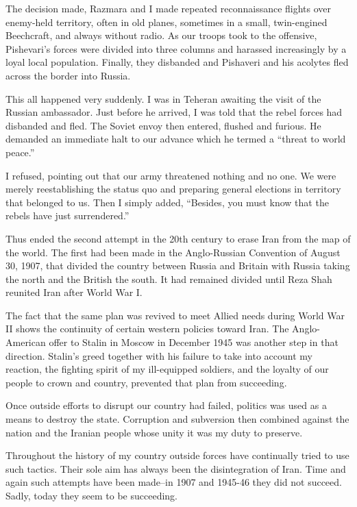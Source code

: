 The decision made, Razmara and I made repeated reconnaissance flights over enemy-held territory, often in old planes, sometimes in a small, twin-engined Beechcraft, and always without radio. As our troops took to the offensive, Pishevari's forces were divided into three columns and harassed increasingly by a loyal local population. Finally, they disbanded and Pishaveri and his acolytes fled across the border into Russia. 

This all happened very suddenly. I was in Teheran awaiting the visit of the Russian ambassador. Just before he arrived, I was told that the rebel forces had disbanded and fled. The Soviet envoy then entered, flushed and furious. He demanded an immediate halt to our advance which he termed a “threat to world peace.” 

I refused, pointing out that our army threatened nothing and no one. We were merely reestablishing the status quo and preparing general elections in territory that belonged to us. Then I simply added, “Besides, you must know that the rebels have just surrendered.” 

Thus ended the second attempt in the 20th century to erase Iran from the map of the world. The first had been made in the Anglo-Russian Convention of August 30, 1907, that divided the country between Russia and Britain with Russia taking the north and the British the south. It had remained divided until Reza Shah reunited Iran after World War I. 

The fact that the same plan was revived to meet Allied needs during World War II shows the continuity of certain western policies toward Iran. The Anglo-American offer to Stalin in Moscow in December 1945 was another step in that direction. Stalin's greed together with his failure to take into account my reaction, the fighting spirit of my ill-equipped soldiers, and the loyalty of our people to crown and country, prevented that plan from succeeding. 

Once outside efforts to disrupt our country had failed, politics was used as a means to destroy the state. Corruption and subversion then combined against the nation and the Iranian people whose unity it was my duty to preserve. 

Throughout the history of my country outside forces have continually tried to use such tactics. Their sole aim has always been the disintegration of Iran. Time and again such attempts have been made--in 1907 and 1945-46 they did not succeed. Sadly, today they seem to be succeeding. 